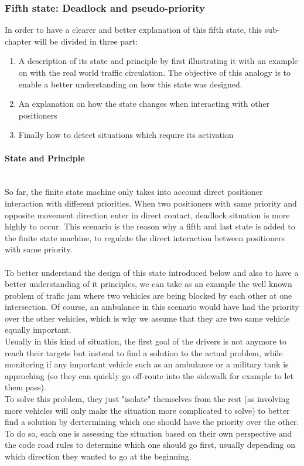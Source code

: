 \documentclass[]{spie}  %
\begin{document}
	\subsubsection{Fifth state: Deadlock and pseudo-priority}
	\label{sub_chapter_fifth_state}
	In order to have a clearer and better explanation of this fifth state, this sub-chapter will be divided in three part: 
	\begin{enumerate}
		\item A description of its state and principle by first illustrating it with an example on with the real world traffic circulation. The objective of this analogy is to enable a better understanding on how this state was designed.
		\item An explanation on how the state changes when interacting with other positioners
		\item Finally how to detect situations which require its activation
	\end{enumerate}
	
	\paragraph{State and Principle}\mbox{}\\
	
	So far, the finite state machine only takes into account direct positioner interaction with different priorities.
	When two positioners with same priority and opposite movement direction enter in direct contact, deadlock situation is more highly to occur. This scenario is the reason why a fifth and last state is added to the finite state machine, to regulate the direct interaction between positioners with same priority.\\\\	
	To better understand the design of this state introduced below and also to have a better understanding of it principles, we can take as an example the well known problem of trafic jam where two vehicles are being blocked by each other at one intersection. Of course, an ambulance in this scenario would have had the priority over the other vehicles, which is why we assume that they are two same vehicle equally important.\\
	Usually in this kind of situation, the first goal of the drivers is not anymore to reach their targets but instead to find a solution to the actual problem, while monitoring if any important vehicle such as an ambulance or a military tank is approching (so they can quickly go off-route into the sidewalk for example to let them pass).\\ 
	To solve this problem, they just "isolate" themselves from the rest (as involving more vehicles will only make the situation more complicated to solve) to better find a solution by dertermining which one should have the priority over the other. 
	To do so, each one is assessing the situation based on their own perspective and the code road rules to determine which one should go first, usually depending on which direction they wanted to go at the beginning.\\
	
\end{document}
